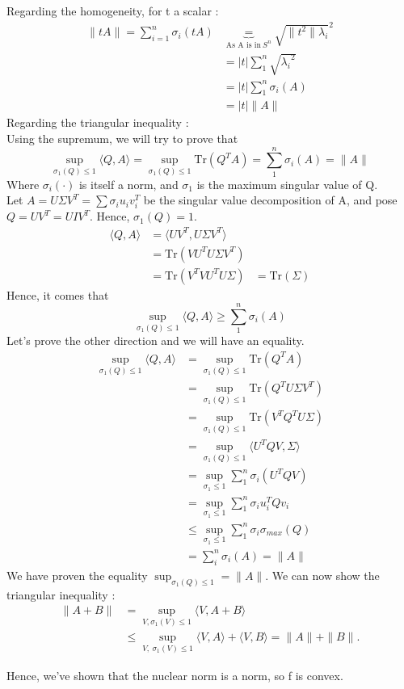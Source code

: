 \documentclass[12pt,a4paper]{article}
\begin{document}
Regarding the homogeneity, for t a scalar :
\begin{align*}
	\|tA\| = \sum_{i=1}^{n}\sigma_i (tA) &\underbrace{=}_{\text{As A is in}~S^n} 
	\sqrt{\|t^2\|\lambda_i}^2\\
	       &= |t| \sum_1^n \sqrt{{\lambda_i}^2}\\
	       &= |t| \sum_1^n \sigma_i (A)\\
	       &= |t| \|A\|
\end{align*}
Regarding the triangular inequality :\\
Using the supremum, we will try to prove that \[ \sup_{\sigma_1(Q)\leq 1} \langle Q,A \rangle = 
\sup_{\sigma_1(Q)\leq 1} \text{Tr}(Q^TA)=\sum_1^n \sigma_i(A)=\|A\| 
\] Where $ \sigma_i(\cdot) $ is itself a norm, and $ \sigma_1 $ is the maximum singular value of Q. \\
Let $ A = U\Sigma V^T = \sum \sigma_i u_i v_i^T $ be the singular value decomposition of A, and pose $ Q=UV^T = UIV^T$. 
Hence, $ \sigma_1(Q)=1 $.\\
\begin{align*}
	\langle Q,A \rangle &= \langle UV^T, U\Sigma V^T \rangle \\
			    &= \text{Tr}(VU^TU\Sigma V^T)\\
			    &= \text{Tr}(V^TVU^TU\Sigma)
			    &= \text{Tr}(\Sigma)
\end{align*}
Hence, it comes that \[
	\sup_{\sigma_1(Q)\leq 1} \langle Q,A \rangle \geq \sum_1^n \sigma_i(A)
\]
Let's prove the other direction and we will have an equality. \begin{align*}
	\sup_{\sigma_1(Q)\leq 1} \langle Q,A \rangle &= \sup_{\sigma_1(Q)\leq1} \text{Tr}(Q^TA) \\
						    &= \sup_{\sigma_1(Q)\leq 1}\text{Tr}(Q^TU\Sigma V^T)\\
						    &= \sup_{\sigma_1(Q)\leq 1}\text{Tr}(V^TQ^TU\Sigma)\\
						    &= \sup_{\sigma_1(Q)\leq 1}\langle U^TQV,\Sigma \rangle \\
						    &= \sup_{\sigma_1\leq 1}\sum_1^n \sigma_i(U^TQV)\\
						    &= \sup_{\sigma_1 \leq 1} \sum_1^n \sigma_i u_i^T Q v_i \\
						    & \leq \sup_{\sigma_1 \leq 1} \sum_1^n \sigma_i \sigma_{max}(Q)\\
						    &= \sum_i^n \sigma_i (A) = \|A\|	 
\end{align*}
We have proven the equality $ \sup_{\sigma_1(Q)\leq 1} = \|A\| $. We can now show the triangular inequality : \begin{align*}
	\|A+B\| &= \sup_{V, \sigma_1(V)\leq 1} \langle V, A+B \rangle \\
	&\leq \sup_{V,~\sigma_1(V)\leq 1}\langle V, A \rangle + \langle V, B \rangle = \|A\|+\|B\|.
\end{align*}
 
Hence, we've shown that the nuclear norm is a norm, so f is convex.
\end{document}
